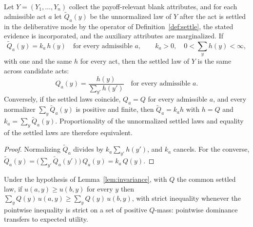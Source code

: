 \begin{lemma}
\label{lem:invariance}
Let $Y = (Y_1, \ldots, Y_n)$ collect the payoff-relevant blank attributes, and for each admissible act $a$ let $\widetilde Q_a(y)$ be the unnormalized law of $Y$ after the act is settled in the deliberative mode by the operator of Definition~\ref{def:settle}, the stated evidence is incorporated, and the auxiliary attributes are marginalized. If
\[
\widetilde Q_a(y) = k_a\, h(y) \quad \text{for every admissible } a, \qquad k_a > 0, \quad 0 < \sum_y h(y) < \infty,
\]
with one and the same $h$ for every act, then the settled law of $Y$ is the same across candidate acts: \[ Q_a(y) = \frac{h(y)}{\sum_{y'} h(y')} \quad \text{for every admissible } a. \] Conversely, if the settled laws coincide, $Q_a = Q$ for every admissible $a$, and every normalizer $\sum_y \widetilde Q_a(y)$ is positive and finite, then $\widetilde Q_a = k_a h$ with $h = Q$ and $k_a = \sum_y \widetilde Q_a(y)$. Proportionality of the unnormalized settled laws and equality of the settled laws are therefore equivalent. \end{lemma} \begin{proof} Normalizing $\widetilde Q_a$ divides by $k_a \sum_{y'} h(y')$, and $k_a$ cancels. For the converse, $\widetilde Q_a(y) = \bigl(\sum_{y'} \widetilde Q_a(y')\bigr)\, Q_a(y) = k_a\, Q(y)$. \end{proof}

\begin{corollary}
\label{cor:dominance-transfer}
Under the hypothesis of Lemma~\ref{lem:invariance}, with $Q$ the common settled law, if $u(a, y) \ge u(b, y)$ for every $y$ then $\sum_y Q(y)\, u(a, y) \ge \sum_y Q(y)\, u(b, y)$, with strict inequality whenever the pointwise inequality is strict on a set of positive $Q$-mass: pointwise dominance transfers to expected utility.
\end{corollary}

